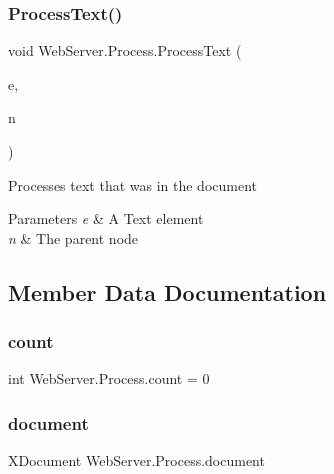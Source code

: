 \subsubsection{\texorpdfstring{Process\+Text()}{ProcessText()}}
{\footnotesize\ttfamily void Web\+Server.\+Process.\+Process\+Text (\begin{DoxyParamCaption}\item[{X\+Text}]{e,  }\item[{\hyperlink{class_web_server_1_1_node}{Node}}]{n }\end{DoxyParamCaption})\hspace{0.3cm}{\ttfamily [private]}}



Processes text that was in the document 


\begin{DoxyParams}{Parameters}
{\em e} & A Text element\\
\hline
{\em n} & The parent node\\
\hline
\end{DoxyParams}


\subsection{Member Data Documentation}
\mbox{\label{class_web_server_1_1_process_afee0af2eabd4725990ebc0c550a20014}} 
\subsubsection{\texorpdfstring{count}{count}}
{\footnotesize\ttfamily int Web\+Server.\+Process.\+count = 0\hspace{0.3cm}{\ttfamily [private]}}

\mbox{\label{class_web_server_1_1_process_a4f27dd3d0d4b003338bdde9058d30493}} 
\subsubsection{\texorpdfstring{document}{document}}
{\footnotesize\ttfamily X\+Document Web\+Server.\+Process.\+document\hspace{0.3cm}{\ttfamily [private]}}

